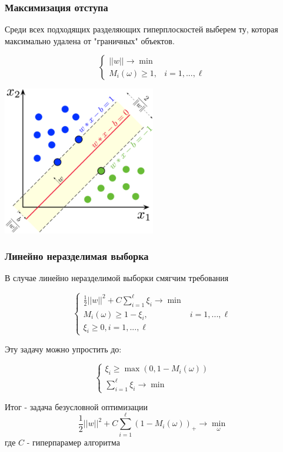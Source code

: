 \documentclass{beamer}
\begin{document}
	\begin{frame}
		\frametitle{Максимизация отступа}
		Среди всех подходящих разделяющих гиперплоскостей выберем ту, которая максимально удалена от "граничных" объектов.
		
		\vspace{15pt}
		
		\[
		\begin{cases}
			||w|| \rightarrow \min \\
			M_i(\omega) \ge 1, &  i=1, ..., \ell
		\end{cases}
		\]
		
		\includegraphics[width=0.5\textwidth]{img/svm.png}
	\end{frame}
	
	\begin{frame}
		\frametitle{Линейно неразделимая выборка}
		В случае линейно неразделимой выборки смягчим требования
		
		\[
		\begin{cases}
			\frac{1}{2}||w||^2 + C \sum_{i=1}^{\ell} \xi_i \rightarrow \min \\
			M_i(\omega) \ge 1 - \xi_i, &  i=1, ..., \ell \\
			\xi_i \ge 0, i=1, ..., \ell
		\end{cases}
		\]
		
		Эту задачу можно упростить до:
		
		\[
		\begin{cases}
			\xi_i \ge \max(0, 1 - M_i(\omega)) \\
			\sum_{i=1}^{\ell} \xi_i \rightarrow \min
			
		\end{cases}
		\]
		
		Итог - задача безусловной оптимизации
		\[
		\frac{1}{2}||w||^2 + C \sum_{i=1}^{\ell} (1 - M_i(\omega))_{+} \rightarrow \min_{\omega}
		\]
		где $C$ - гиперпарамер алгоритма
	\end{frame}
	
\end{document}
